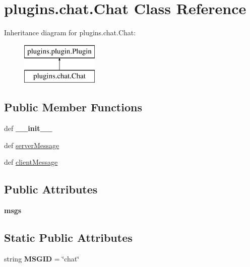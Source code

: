 \hypertarget{classplugins_1_1chat_1_1_chat}{\section{plugins.\-chat.\-Chat \-Class \-Reference}
\label{classplugins_1_1chat_1_1_chat}
}
\-Inheritance diagram for plugins.\-chat.\-Chat\-:\begin{figure}[H]
\begin{center}
\leavevmode
\includegraphics[height=2.000000cm]{classplugins_1_1chat_1_1_chat}
\end{center}
\end{figure}
\subsection*{\-Public \-Member \-Functions}
\begin{DoxyCompactItemize}
\item 
\hypertarget{classplugins_1_1chat_1_1_chat_ae62256183dbaeded5984584f1f324ab6}{def {\bfseries \-\_\-\-\_\-init\-\_\-\-\_\-}}\label{classplugins_1_1chat_1_1_chat_ae62256183dbaeded5984584f1f324ab6}

\item 
def \hyperlink{classplugins_1_1chat_1_1_chat_af8546a2537aee9bf99e09007649e2320}{server\-Message}
\item 
def \hyperlink{classplugins_1_1chat_1_1_chat_ad241689aeb8b03c689248ffb18584d40}{client\-Message}
\end{DoxyCompactItemize}
\subsection*{\-Public \-Attributes}
\begin{DoxyCompactItemize}
\item 
\hypertarget{classplugins_1_1chat_1_1_chat_a4082230dd09dc360fa943d7a491bc0b8}{{\bfseries msgs}}\label{classplugins_1_1chat_1_1_chat_a4082230dd09dc360fa943d7a491bc0b8}

\end{DoxyCompactItemize}
\subsection*{\-Static \-Public \-Attributes}
\begin{DoxyCompactItemize}
\item 
\hypertarget{classplugins_1_1chat_1_1_chat_ae47990387dbc71e4f121122c2c822aa8}{string {\bfseries \-M\-S\-G\-I\-D} = \char`\"{}chat\char`\"{}}\label{classplugins_1_1chat_1_1_chat_ae47990387dbc71e4f121122c2c822aa8}

\end{DoxyCompactItemize}


